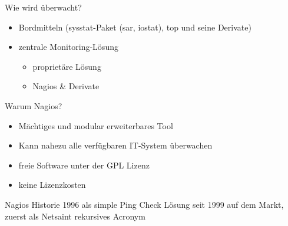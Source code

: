\documentclass[12pt]{beamer}
\begin{document}
\begin{frame}{Wie wird überwacht?}
	\begin{itemize}
		\item Bordmitteln (sysstat-Paket (sar, iostat), top und seine Derivate)
		\item zentrale Monitoring-Lösung
		\begin{itemize}
			\item proprietäre Lösung
			\item Nagios \& Derivate
		\end{itemize}
	\end{itemize}
	
\end{frame}
\begin{frame}{Warum Nagios?}
	\begin{itemize}
		\item Mächtiges und modular erweiterbares Tool
		\item Kann nahezu alle verfügbaren IT-System überwachen
		\item freie Software unter der GPL Lizenz
		\item keine Lizenzkosten
	\end{itemize}
\end{frame}
\begin{frame}{Nagios Historie}
	1996 als simple Ping Check Lösung 
	seit 1999 auf dem Markt, zuerst als Netsaint
	rekursives Acronym
	

\end{frame}
\end{document}
